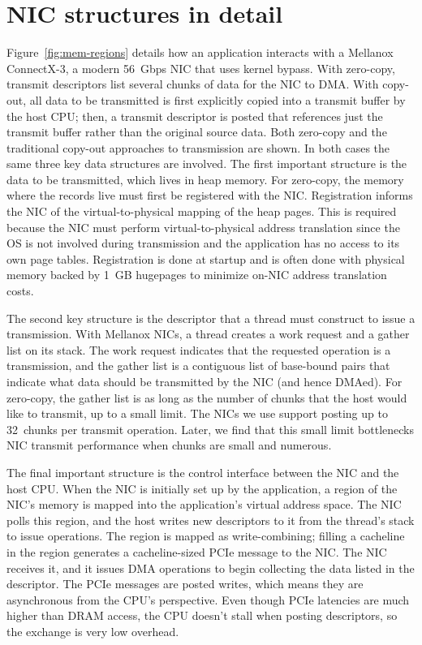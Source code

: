 \section{NIC structures in detail}

Figure~\ref{fig:mem-regions} details how an application interacts with a Mellanox
ConnectX-3\textregistered , a modern 56~Gbps NIC that uses kernel bypass. 
With zero-copy, transmit descriptors list several chunks of data for
the NIC to DMA. With copy-out, all data to be transmitted is first explicitly
copied into a transmit buffer by the host CPU; then, a transmit descriptor is
posted that references just the transmit buffer rather than the original
source data. Both zero-copy and the traditional copy-out approaches to transmission are shown.
In both cases the same three key data structures are involved. The first important structure is the
data to be transmitted, which lives in heap memory.  For zero-copy, the memory
where the records live must first be registered with the NIC. Registration
informs the NIC of the virtual-to-physical mapping of the heap pages. This is
required because the NIC must perform virtual-to-physical address translation
since the OS is not involved during transmission and the application has no
access to its own page tables.  Registration is done at startup and is often
done with physical memory backed by 1~GB hugepages to minimize on-NIC address
translation costs.

The second key structure is the descriptor that a thread must construct to
issue a transmission. With Mellanox NICs, a thread creates a work request and a
gather list on its stack. The work request indicates that the requested
operation is a transmission, and the gather list is a contiguous list of
base-bound pairs that indicate what data should be transmitted by the NIC (and
hence DMAed). For zero-copy, the gather list is as long as the number of chunks
that the host would like to transmit, up to a small limit. The NICs we use support
posting up to 32~chunks per transmit operation. Later, we find that this small
limit bottlenecks NIC transmit performance when chunks are small and numerous.

The final important structure is the control interface between the NIC and the
host CPU.  When the NIC is initially set up by the application, a region of the
NIC's memory is mapped into the application's virtual address space. The NIC
polls this region, and the host writes new descriptors to it from the thread's
stack to issue operations. The region is mapped as write-combining; filling a
cacheline in the region generates a cacheline-sized PCIe message to the NIC.
The NIC receives it, and it issues DMA operations to begin collecting the data
listed in the descriptor. The PCIe messages are posted writes, which means they
are asynchronous from the CPU's perspective. Even though PCIe latencies are much
higher than DRAM access, the CPU doesn't stall when posting descriptors, so the
exchange is very low overhead.

